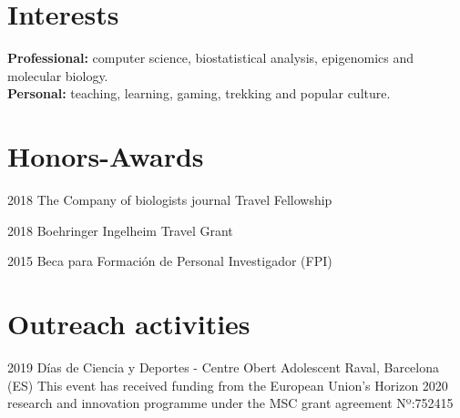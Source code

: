 \documentclass[]{friggeri-cv} %
\begin{document}
\vspace{5mm}

\section{Interests}

\textbf{Professional:} computer science, biostatistical analysis, epigenomics and molecular biology. \\ \textbf{Personal:} teaching, learning, gaming, trekking and popular culture. \\

\section{Honors-Awards}

\begin{entrylist}

\entry
{2018}
{The Company of biologists journal Travel Fellowship}
{}

\entry
{2018}
{Boehringer Ingelheim Travel Grant}
{}

\entry
{2015}
{Beca para Formación de Personal Investigador (FPI) }
{}

\end{entrylist}

\section{Outreach activities}

\begin{entrylist}

\entry
{2019}
{Días de Ciencia y Deportes - Centre Obert Adolescent Raval, Barcelona (ES)}
{}
{This event has received funding from the European Union’s Horizon 2020 research and innovation programme under the MSC
grant agreement Nº:752415}

\end{entrylist}
\end{document}
